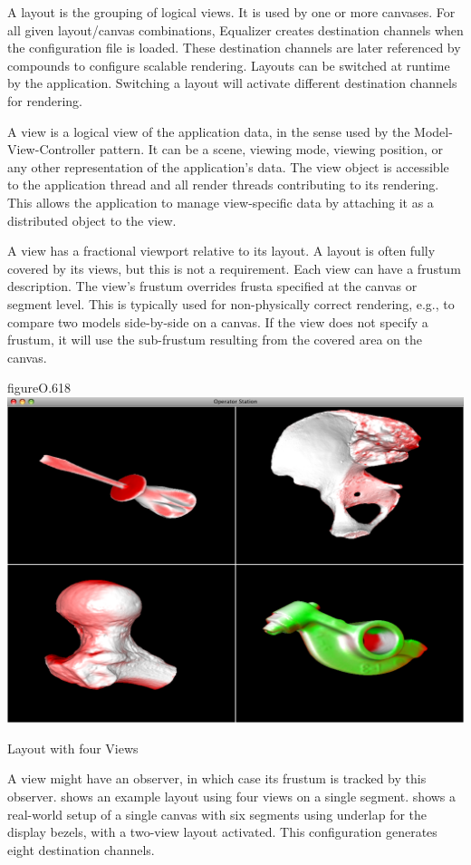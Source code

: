 A \textsf{layout} is the grouping of logical views. It is used by one or more
canvases. For all given layout/canvas combinations, Equalizer creates
destination channels when the configuration file is loaded. These destination
channels are later referenced by compounds to configure scalable rendering.
Layouts can be switched at runtime by the application. Switching a layout will
activate different destination channels for rendering.

A \textsf{view} is a logical view of the application data, in the sense used by
the Model-View-Controller pattern. It can be a scene, viewing mode, viewing
position, or any other representation of the application's data. The view
object is accessible to the application thread and all render threads
contributing to its rendering. This allows the application to manage
view-specific data by attaching it as a distributed object to the view.

A view has a fractional viewport relative to its layout. A layout is often
fully covered by its views, but this is not a requirement. Each view can have a
frustum description. The view's frustum overrides frusta specified at the
canvas or segment level. This is typically used for non-physically correct
rendering, e.g., to compare two models side-by-side on a canvas. If the view
does not specify a frustum, it will use the sub-frustum resulting from the
covered area on the canvas.

\begin{wrapfloat}{figure}{O}{.618\textwidth}
 \includegraphics[width=.618\textwidth]{images/layout.png}
 {\caption{\label{fLayout}Layout with four Views}}
\end{wrapfloat}

A view might have an observer, in which case its frustum is tracked by this
observer.  shows an example layout using four views on a single
segment.  shows a real-world setup of a single canvas with six
segments using underlap for the display bezels, with a two-view layout
activated. This configuration generates eight destination channels.


